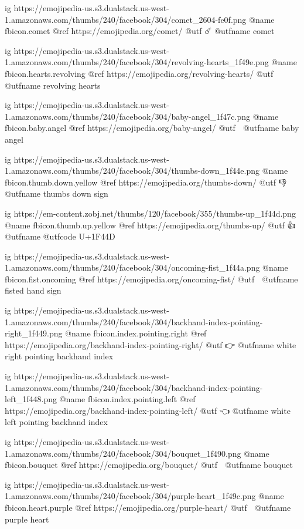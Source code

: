   ig https://emojipedia-us.s3.dualstack.us-west-1.amazonaws.com/thumbs/240/facebook/304/comet_2604-fe0f.png
  @name fbicon.comet
  @ref https://emojipedia.org/comet/
  @utf ☄️
  @utfname comet

  ig https://emojipedia-us.s3.dualstack.us-west-1.amazonaws.com/thumbs/240/facebook/304/revolving-hearts_1f49e.png
  @name fbicon.hearts.revolving
  @ref https://emojipedia.org/revolving-hearts/
  @utf 💞
  @utfname revolving hearts

  ig https://emojipedia-us.s3.dualstack.us-west-1.amazonaws.com/thumbs/240/facebook/304/baby-angel_1f47c.png
  @name fbicon.baby.angel
  @ref https://emojipedia.org/baby-angel/
  @utf 👼
  @utfname baby angel

  ig https://emojipedia-us.s3.dualstack.us-west-1.amazonaws.com/thumbs/240/facebook/304/thumbs-down_1f44e.png
  @name fbicon.thumb.down.yellow
  @ref https://emojipedia.org/thumbs-down/
  @utf 👎
  @utfname thumbs down sign

	ig https://em-content.zobj.net/thumbs/120/facebook/355/thumbs-up_1f44d.png
	@name fbicon.thumb.up.yellow
	@ref https://emojipedia.org/thumbs-up/
	@utf 👍
	@utfname
	@utfcode U+1F44D

  ig https://emojipedia-us.s3.dualstack.us-west-1.amazonaws.com/thumbs/240/facebook/304/oncoming-fist_1f44a.png
  @name fbicon.fist.oncoming
  @ref https://emojipedia.org/oncoming-fist/
  @utf 👊
  @utfname fisted hand sign

  ig https://emojipedia-us.s3.dualstack.us-west-1.amazonaws.com/thumbs/240/facebook/304/backhand-index-pointing-right_1f449.png
  @name fbicon.index.pointing.right
  @ref https://emojipedia.org/backhand-index-pointing-right/
  @utf 👉
  @utfname white right pointing backhand index

  ig https://emojipedia-us.s3.dualstack.us-west-1.amazonaws.com/thumbs/240/facebook/304/backhand-index-pointing-left_1f448.png
  @name fbicon.index.pointing.left
  @ref https://emojipedia.org/backhand-index-pointing-left/
  @utf 👈
  @utfname white left pointing backhand index

  ig https://emojipedia-us.s3.dualstack.us-west-1.amazonaws.com/thumbs/240/facebook/304/bouquet_1f490.png
  @name fbicon.bouquet
  @ref https://emojipedia.org/bouquet/
  @utf 💐
  @utfname bouquet

  ig https://emojipedia-us.s3.dualstack.us-west-1.amazonaws.com/thumbs/240/facebook/304/purple-heart_1f49c.png
  @name fbicon.heart.purple
  @ref https://emojipedia.org/purple-heart/
  @utf 💜
  @utfname purple heart

